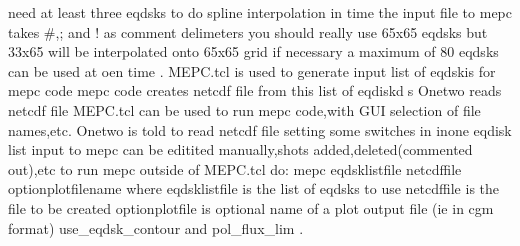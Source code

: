 need at least three eqdsks to do spline interpolation in time
the input file to mepc takes #,; and ! as comment delimeters
you should really use 65x65 eqdsks but 33x65 will be interpolated onto 65x65 grid
if necessary
a maximum of 80 eqdsks can be used at oen time
.
MEPC.tcl is used to generate input list of eqdskis for mepc code
mepc code creates netcdf file from this list of eqdiskds
Onetwo reads netcdf file
MEPC.tcl can be used to run mepc code,with GUI selection of file names,etc.
Onetwo is told to read netcdf file setting some switches in inone
eqdisk list input to mepc can be editited manually,shots added,deleted(commented out),etc
to run mepc outside of MEPC.tcl do:
mepc eqdsklistfile netcdffile optionplotfilename
where eqdsklistfile is the list of eqdsks to use
netcdffile is the file to be created
optionplotfile is optional name of a plot output file (ie in cgm format)
use_eqdsk_contour and pol_flux_lim
.
